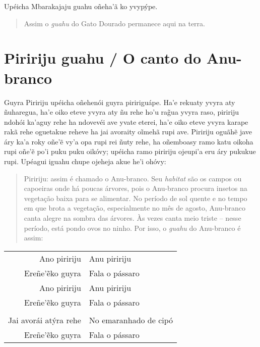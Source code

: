 Upéicha Mbarakajaju guahu oñeha'ã ko yvypýpe.

\begin{quote}
Assim o \emph{guahu} do Gato Dourado permanece aqui na terra.
\end{quote}

\chapter{Piririju guahu / O canto do Anu-branco}

Guyra Piririju upéicha oñehenói guyra piririguápe. Ha'e rekuaty yvyra
aty ñuharegua, ha'e oiko eteve yvyra aty ñu rehe ho'u rag̃ua yvyra raso,
piririju ndohói ka'aguy rehe ha ndovevéi ave yvate eterei, ha'e oiko
eteve yvyra karape rakã rehe oguetakue reheve ha jai avoraity oĩmehã
rupi ave. Piririju oguãhẽ jave áry ka'a roky oñe'ẽ vy'a opa rupi rei
ñuty rehe, ha oñemboasy ramo katu oikoha rupi oñe'ẽ po'i puku puku
oikóvy; upéicha ramo piririju ojeupi'a eru áry pukukue rupi. Upéagui
iguahu chupe ojeheja akue he'i ohóvy:

\begin{quote}
Piririju: assim é chamado o Anu-branco. Seu \emph{habitat} são os campos
ou capoeiras onde há poucas árvores, pois o Anu-branco procura insetos
na vegetação baixa para se alimentar. No período de sol quente e no
tempo em que brota a vegetação, especialmente no mês de agosto,
Anu-branco canta alegre na sombra das árvores. Às vezes canta meio
triste -- nesse período, está pondo ovos no ninho. Por isso, o
\emph{guahu} do Anu-branco é assim:
\end{quote}


\begin{table}[]
\begin{tabular}{rl}
Ano piririju          & Anu piririju\footnotemark{}           \\
Ereñe'ẽko guyra          & Fala o pássaro           \\
Ano piririju 		& Anu piririju \\
Ereñe'ẽko guyra          & Fala o pássaro           \\
                  &                     \\
Jai avorái atýra rehe 		& No emaranhado de cipó\footnotemark{} \\
Ereñe'ẽko guyra          & Fala o pássaro           \\
\end{tabular}
\end{table}

